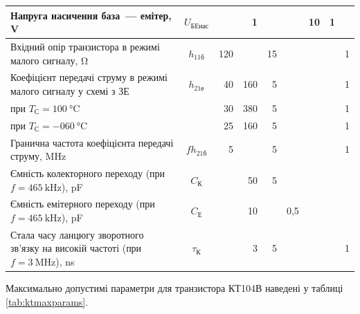 \documentclass[14pt,ukrainian,utf8,simple]{eskdtext}
\begin{document}
\begin{longtable}[c]{|x{0.22\textwidth}|c|r|r|r|r|r|r|r|}
				\hline
				Напруга насичення база~--- емітер, \si{\volt}                                                                  & $U_{\text{БЕнас}}$ &     & 1     &       &       & 10 & 1 & \\
				\hline
				Вхідний опір транзистора в режимі малого сигналу, \si{\ohm}                                                    & $h_{11\text{б}}$   & 120 &       & 15    &       &    &   & 1 \\
				\hline
				Коефіцієнт передачі струму в режимі малого сигналу у схемі з ЗЕ                                                & $h_{21\text{е}}$   & 40  & 160   & 5     &       &    &   & 1 \\
				при $T_{\text{С}} = \SI{+100}{\celsius}$                                                                       &                    & 30  & 380   & 5     &       &    &   & 1 \\
				при $T_{\text{С}} = \SI{-060}{\celsius}$                                                                       &                    & 25  & 160   & 5     &       &    &   & 1 \\
				\hline
				Гранична частота коефіцієнта передачі струму, \si{\mega\hertz}                                                 & $fh_{21\text{б}}$  & 5   &       & 5     &       &    &   & 1 \\
				\hline
				Ємність колекторного переходу (при $f = \SI{465}{\kilo\hertz}$), \si{\pico\farad}                              & $C_{\text{К}}$     &     & 50    & 5     &       &    &   &\\
				\hline
				Ємність емітерного переходу (при $f = \SI{465}{\kilo\hertz}$), \si{\pico\farad}                                & $C_{\text{Е}}$     &     & 10    &       & 0{,}5 &    &   &\\
				\hline
				Стала часу ланцюгу зворотного зв'язку на високій частоті (при $f = \SI{3}{\mega\hertz}$), \si{\nano\second}    & $\tau_{\text{К}}$  &     & 3     & 5     &       &    &   & 1\\
			\hline
		\end{longtable}
			
		Максимально допустимі параметри для транзистора КТ104В наведені у таблиці \ref{tab:ktmaxparams}.
		
\end{document}
